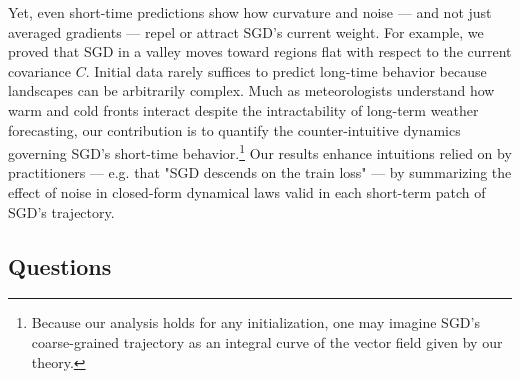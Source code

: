\documentclass{article}
\theoremstyle{plain}
\theoremstyle{definition}
\begin{document}
        Yet, even short-time predictions show how curvature and noise ---
        and not just averaged gradients --- repel or attract SGD's current
        weight.  For example, we proved that SGD in a valley moves toward
        regions flat with respect to the current covariance $C$.  Initial data
        rarely suffices to predict long-time behavior because landscapes can be
        arbitrarily complex.  Much as meteorologists understand how warm and
        cold fronts interact despite the intractability of long-term weather
        forecasting, our contribution is to quantify the counter-intuitive
        dynamics governing SGD's short-time behavior.\footnote{
            Because our analysis holds for any initialization, one may imagine
            SGD's coarse-grained trajectory as an integral curve of the vector
            field given by our theory.
        }
        Our results enhance intuitions relied on by practitioners --- e.g. that
        "SGD descends on the train loss" --- by summarizing the effect of noise
        in closed-form dynamical laws valid in each short-term patch of
        SGD's trajectory.



    \subsection{Questions}
\end{document}

